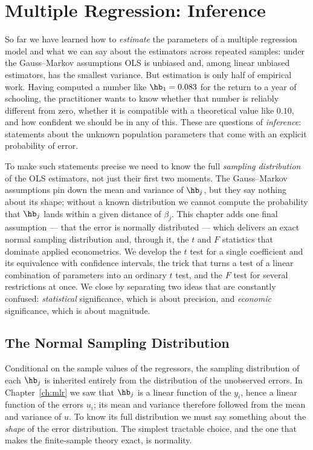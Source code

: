 \chapter{Multiple Regression: Inference}
\label{ch:inference}

So far we have learned how to \emph{estimate} the parameters of a multiple regression model and what we can say about the estimators across repeated samples: under the Gauss--Markov assumptions OLS is unbiased and, among linear unbiased estimators, has the smallest variance. But estimation is only half of empirical work. Having computed a number like $\hb_1 = 0.083$ for the return to a year of schooling, the practitioner wants to know whether that number is reliably different from zero, whether it is compatible with a theoretical value like $0.10$, and how confident we should be in any of this. These are questions of \emph{inference}: statements about the unknown population parameters that come with an explicit probability of error.

To make such statements precise we need to know the full \emph{sampling distribution} of the OLS estimators, not just their first two moments. The Gauss--Markov assumptions pin down the mean and variance of $\hb_j$, but they say nothing about its shape; without a known distribution we cannot compute the probability that $\hb_j$ lands within a given distance of $\beta_j$. This chapter adds one final assumption --- that the error is normally distributed --- which delivers an exact normal sampling distribution and, through it, the $t$ and $F$ statistics that dominate applied econometrics. We develop the $t$ test for a single coefficient and its equivalence with confidence intervals, the trick that turns a test of a linear combination of parameters into an ordinary $t$ test, and the $F$ test for several restrictions at once. We close by separating two ideas that are constantly confused: \emph{statistical} significance, which is about precision, and \emph{economic} significance, which is about magnitude.

\section{The Normal Sampling Distribution}

Conditional on the sample values of the regressors, the sampling distribution of each $\hb_j$ is inherited entirely from the distribution of the unobserved errors. In Chapter~\ref{ch:mlr} we saw that $\hb_j$ is a linear function of the $y_i$, hence a linear function of the errors $u_i$; its mean and variance therefore followed from the mean and variance of $u$. To know its full distribution we must say something about the \emph{shape} of the error distribution. The simplest tractable choice, and the one that makes the finite-sample theory exact, is normality.


